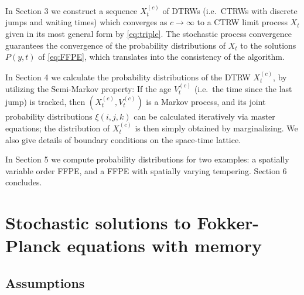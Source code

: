 \documentclass[a4paper,12pt]{elsarticle}
\numberwithin{equation}{section}
\theoremstyle{plain}
\theoremstyle{definition}
\theoremstyle{remark}
\numberwithin{equation}{section}
\newcommand{\1}{\mathbf 1}
\begin{document}
In Section 3 we construct a sequence $X^{(c)}_t$ of DTRWs (i.e.\ CTRWs with discrete jumps and waiting times) which converges as 
$c \to \infty$ to a CTRW limit process $X_t$ given in its most general form by \eqref{eq:triple}.  The stochastic process convergence guarantees the convergence of the probability distributions of $X_t$ to the solutions $P(y,t)$ of \eqref{eq:FFPE}, which translates into the consistency of the algorithm. 

In Section 4 we calculate the probability distributions of the DTRW $X^{(c)}_t$, by utilizing the Semi-Markov property: If the age $V^{(c)}_t$ (i.e.\ the time since the last jump) is tracked, then 
$(X^{(c)}_t, V^{(c)}_t)$ is a Markov process, and its joint probability distributions $\xi(i,j,k)$ can be calculated iteratively via master equations; the distribution of $X^{(c)}_t$ is then simply obtained by marginalizing. We also give details of boundary conditions on the space-time lattice.

In Section 5 we compute probability distributions for two examples: a spatially variable order FFPE, and a FFPE with spatially varying tempering. Section 6 concludes. 





\section{Stochastic solutions to Fokker-Planck equations with memory}

\subsection{Assumptions}
\end{document}
